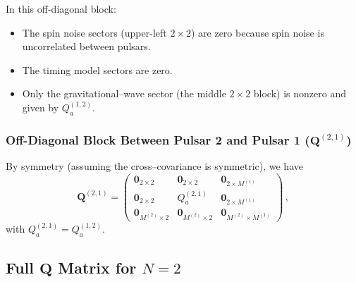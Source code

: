 \documentclass[]{scrartcl}
\begin{document}
	In this off-diagonal block:
	\begin{itemize}
		\item The spin noise sectors (upper-left \(2\times2\)) are zero because spin noise is uncorrelated between pulsars.
		\item The timing model sectors are zero.
		\item Only the gravitational–wave sector (the middle \(2\times2\) block) is nonzero and given by \(Q_a^{(1,2)}\).
	\end{itemize}
	
	\subsubsection*{Off-Diagonal Block Between Pulsar 2 and Pulsar 1 (\(\boldsymbol{Q}^{(2,1)}\))}
	
	By symmetry (assuming the cross–covariance is symmetric), we have
	\begin{equation}
		\boldsymbol{Q}^{(2,1)} =
		\begin{pmatrix}
			\boldsymbol{0}_{2\times2} & \boldsymbol{0}_{2\times2} & \boldsymbol{0}_{2\times M^{(1)}} \\[2mm]
			\boldsymbol{0}_{2\times2} & Q_a^{(2,1)} & \boldsymbol{0}_{2\times M^{(1)}} \\[2mm]
			\boldsymbol{0}_{M^{(2)}\times2} & \boldsymbol{0}_{M^{(2)}\times2} & \boldsymbol{0}_{M^{(2)}\times M^{(1)}}
		\end{pmatrix}\,,
	\end{equation}
	with \(Q_a^{(2,1)} = Q_a^{(1,2)}\).
	
	\subsection*{Full \(\boldsymbol{Q}\) Matrix for \(N=2\)}
	
\end{document}

